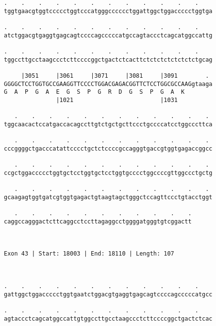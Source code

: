 \documentclass{article}
\begin{document}
\begin{Verbatim}
.    .    .    .    .    .    .    .    .    .    .    .    
tggtgaacgtggtccccctggtcccatgggcccccctggattggctggaccccctggtga
                                                            
.    .    .    .    .    .    .    .    .    .    .    .    
atctggacgtgaggtgagcagtccccagcccccatgccagtaccctcagcatggccattg
                                                            
.    .    .    .    .    .    .    .    .    .    .    .    
tggccttgcctaagccctcttccccggctgactctcacttctctctctctctctctgcag
                                                            
     |3051     |3061     |3071     |3081     |3091        . 
GGGGCTCCTGGTGCCGAAGGTTCCCCTGGACGAGACGGTTCTCCTGGCGCCAAGgtaaga
G  A  P  G  A  E  G  S  P  G  R  D  G  S  P  G  A  K        
               |1021                         |1031          
  
   .    .    .    .    .    .    .    .    .    .    .    . 
tggcaacactccatgaccacagccttgtctgctgcttccctgccccatcctggcccttca
                                                            
   .    .    .    .    .    .    .    .    .    .    .    . 
cccggggctgacccatattcccctgctctccccgccagggtgaccgtggtgagaccggcc
                                                            
   .    .    .    .    .    .    .    .    .    .    .    . 
ccgctggaccccctggtgctcctggtgctcctggtgcccctggccccgttggccctgctg
                                                            
   .    .    .    .    .    .    .    .    .    .    .    . 
gcaagagtggtgatcgtggtgagactgtaagtagctgggctccagttccctgtacctggt
                                                            
   .    .    .    .    .    .    .    .    .    .    .
caggccagggactcttcaggcctccttagaggcctggggatgggtgtcggactt
                                                      
                                                      
 
Exon 43 | Start: 18003 | End: 18110 | Length: 107



.    .    .    .    .    .    .    .    .    .    .    .    
gattggctggaccccctggtgaatctggacgtgaggtgagcagtccccagcccccatgcc
                                                            
.    .    .    .    .    .    .    .    .    .    .    .    
agtaccctcagcatggccattgtggccttgcctaagccctcttccccggctgactctcac
                                                            

\end{Verbatim}
\end{document}
